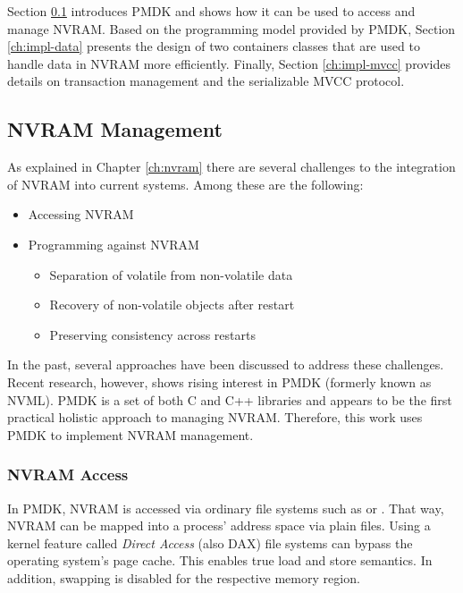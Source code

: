 Section \ref{ch:impl-nvram} introduces PMDK and shows how it can be used to
access and manage NVRAM. Based on the programming model provided by PMDK, Section
\ref{ch:impl-data} presents the design of two containers classes that are used
to handle data in NVRAM more efficiently. Finally, Section \ref{ch:impl-mvcc}
provides details on transaction management and the serializable MVCC protocol.

\subsection{NVRAM Management}
\label{ch:impl-nvram}

As explained in Chapter \ref{ch:nvram} there are several challenges to the
integration of NVRAM into current systems. Among these are the following:

\begin{itemize}
    \item Accessing NVRAM
    \item Programming against NVRAM
    \begin{itemize}
        \item Separation of volatile from non-volatile data
        \item Recovery of non-volatile objects after restart
        \item Preserving consistency across restarts
    \end{itemize}
\end{itemize}

In the past, several approaches have been discussed to address these challenges.
Recent research, however, shows rising interest in PMDK (formerly known as
NVML). PMDK is a set of both C and C++ libraries and appears to be the first
practical holistic approach to managing NVRAM. Therefore, this work uses PMDK to
implement NVRAM management.

\subsubsection{NVRAM Access}

In PMDK, NVRAM is accessed via ordinary file systems such as  or
. That way, NVRAM can be mapped into a process' address space via
plain files. Using a kernel feature called \emph{Direct Access} (also DAX)
file systems can bypass the operating system's page cache. This enables true load
and store semantics. In addition, swapping is disabled for the respective memory
region.

